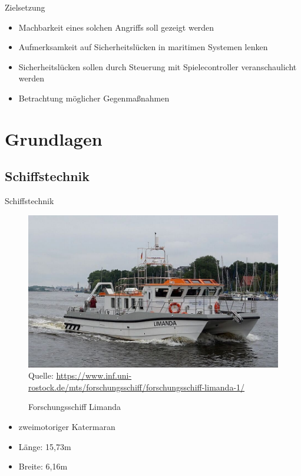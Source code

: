 \documentclass[usenames, dvipsnames, aspectratio=75]{beamer}
\begin{document}
    \begin{frame}{Zielsetzung}
        \begin{itemize}
            \item Machbarkeit eines solchen Angriffs soll gezeigt werden
            \item Aufmerksamkeit auf Sicherheitslücken in maritimen Systemen lenken
            \item Sicherheitslücken sollen durch Steuerung mit Spielecontroller veranschaulicht werden
            \item Betrachtung möglicher Gegenmaßnahmen
        \end{itemize}
    \end{frame}

\section{Grundlagen}

\subsection{Schiffstechnik}
\begin{frame}{Schiffstechnik}
    \begin{figure}
        \centering
        \includegraphics[width=0.6\linewidth]{assets/limanda.png}
        \tiny{Quelle: \url{https://www.inf.uni-rostock.de/mts/forschungsschiff/forschungsschiff-limanda-1/}}
        \caption{Forschungsschiff Limanda}
    \end{figure}
    \begin{itemize}
        \item zweimotoriger Katermaran
        \item Länge: 15,73m 
        \item Breite: 6,16m
    \end{itemize}
\end{frame}
\end{document}
